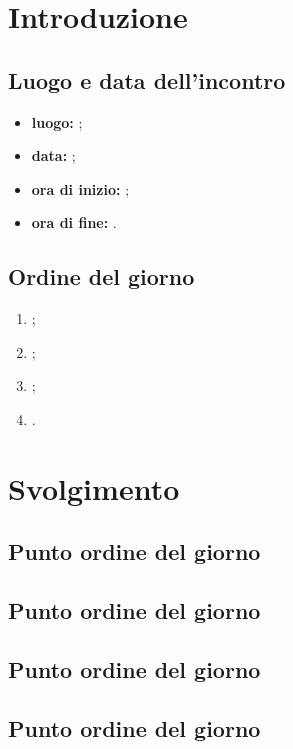 \section*{Introduzione}
\subsection*{Luogo e data dell'incontro}
\begin{itemize}
	\item \textbf{luogo:} ;
	\item \textbf{data:} ;
	\item \textbf{ora di inizio:} ;
	\item \textbf{ora di fine:} .
\end{itemize}

\subsection*{Ordine del giorno}
\begin{enumerate}
	\item ;
	\item ;
	\item ;
	\item .
\end{enumerate}

\section*{Svolgimento}
\subsection*{Punto ordine del giorno}
\subsection*{Punto ordine del giorno}
\subsection*{Punto ordine del giorno}
\subsection*{Punto ordine del giorno}
